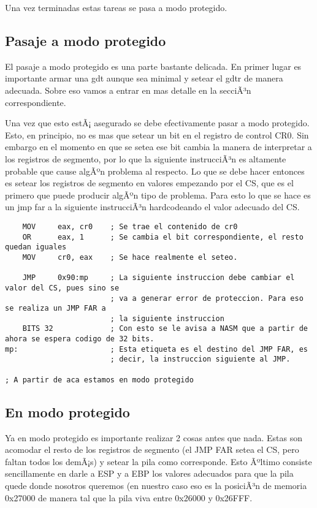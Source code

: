 	Una vez terminadas estas tareas se pasa a modo protegido.

\subsection{Pasaje a modo protegido}

	El pasaje a modo protegido es una parte bastante delicada.
En primer lugar es importante armar una gdt aunque sea minimal y setear
el gdtr de manera adecuada. Sobre eso vamos a entrar en mas detalle
en la secciÃ³n correspondiente.

	Una vez que esto estÃ¡ asegurado se debe efectivamente pasar
a modo protegido. Esto, en principio, no es mas que setear un bit en el
registro de control CR0. Sin embargo en el momento en que se setea
ese bit cambia la manera de interpretar a los registros de segmento, por lo que
la siguiente instrucciÃ³n es altamente probable que cause algÃºn problema al
respecto. Lo que se debe hacer entonces es setear los registros de segmento
en valores empezando por el CS, que es el primero que puede producir algÃºn tipo de problema.
Para esto lo que se hace es un jmp far a la siguiente instrucciÃ³n
hardcodeando el valor adecuado del CS. 

\begin{verbatim}
	MOV		eax, cr0	; Se trae el contenido de cr0
	OR		eax, 1		; Se cambia el bit correspondiente, el resto quedan iguales
	MOV		cr0, eax	; Se hace realmente el seteo.
	
	JMP		0x90:mp		; La siguiente instruccion debe cambiar el valor del CS, pues sino se
						; va a generar error de proteccion. Para eso se realiza un JMP FAR a 
						; la siguiente instruccion
	BITS 32				; Con esto se le avisa a NASM que a partir de ahora se espera codigo de 32 bits.
mp:						; Esta etiqueta es el destino del JMP FAR, es 
						; decir, la instruccion siguiente al JMP.

; A partir de aca estamos en modo protegido
\end{verbatim}

\subsection{En modo protegido}

	Ya en modo protegido es importante realizar 2 cosas
antes que nada. Estas son acomodar el resto de los registros
de segmento (el JMP FAR setea el CS, pero faltan todos los demÃ¡s)
y setear la pila como corresponde. Esto  Ãºltimo consiste sencillamente
en darle a ESP y a EBP los valores adecuados para que la pila quede
donde nosotros queremos (en nuestro caso eso es la posiciÃ³n de memoria 0x27000
de manera tal que la pila viva entre 0x26000 y 0x26FFF.


